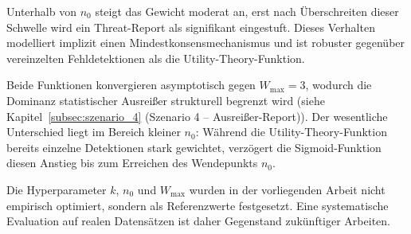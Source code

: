 Unterhalb von $n_0$ steigt das Gewicht moderat an, erst nach Überschreiten dieser Schwelle wird ein Threat-Report als signifikant eingestuft. Dieses Verhalten modelliert implizit einen Mindestkonsensmechanismus und ist robuster gegenüber vereinzelten Fehldetektionen als die Utility-Theory-Funktion.

Beide Funktionen konvergieren asymptotisch gegen $W_{\text{max}} = 3$, wodurch die Dominanz statistischer Ausreißer strukturell begrenzt wird (siehe Kapitel~\ref{subsec:szenario_4} (Szenario 4 – Ausreißer-Report)). Der wesentliche Unterschied liegt im Bereich kleiner $n_0$: Während die Utility-Theory-Funktion bereits einzelne Detektionen stark gewichtet, verzögert die Sigmoid-Funktion diesen Anstieg bis zum Erreichen des Wendepunkts $n_0$.

Die Hyperparameter $k$, $n_0$ und $W_{\text{max}}$ wurden in der vorliegenden Arbeit nicht empirisch optimiert, sondern als Referenzwerte festgesetzt. Eine systematische Evaluation auf realen Datensätzen ist daher Gegenstand zukünftiger Arbeiten.
